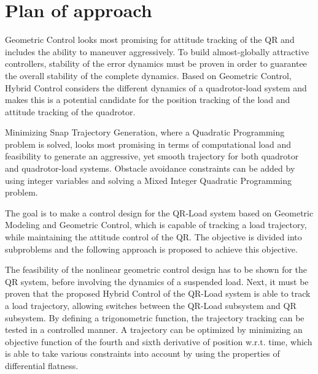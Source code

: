 \chapter*{Plan of approach}

Geometric Control looks most promising for attitude tracking of the QR and includes the ability to maneuver aggressively. To build almost-globally attractive controllers, stability of the error dynamics must be proven in order to guarantee the overall stability of the complete dynamics. Based on Geometric Control, Hybrid Control considers the different dynamics of a quadrotor-load system and makes this is a potential candidate for the position tracking of the load and attitude tracking of the quadrotor.

Minimizing Snap Trajectory Generation, where a Quadratic Programming problem is solved, looks most promising in terms of computational load and feasibility to generate an aggressive, yet smooth trajectory for both quadrotor and quadrotor-load systems. Obstacle avoidance constraints can be added by using integer variables and solving a Mixed Integer Quadratic Programming problem.

The goal is to make a control design for the QR-Load system based on Geometric Modeling and Geometric Control, which is capable of tracking a load trajectory, while maintaining the attitude control of the QR. The objective is divided into subproblems and the following approach is proposed to achieve this objective.

The feasibility of the nonlinear geometric control design has to be shown for the QR system, before involving the dynamics of a suspended load. Next, it must be proven that the proposed Hybrid Control of the QR-Load system is able to track a load trajectory, allowing switches between the QR-Load subsystem and QR subsystem. By defining a trigonometric function, the trajectory tracking can be tested in a controlled manner. A trajectory can be optimized by minimizing an objective function of the fourth and sixth derivative of position w.r.t. time, which is able to take various constraints into account by using the properties of differential flatness.
